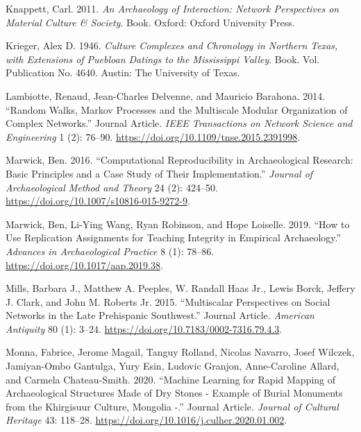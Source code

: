 \documentclass[smallextended]{svjour3}       %
\newlength{\cslhangindent}
\newlength{\cslentryspacingunit} %
\newenvironment{CSLReferences}[2] %
 {%
  \setlength{\parindent}{0pt}
  \ifodd #1
  \let\oldpar\par
  \def\par{\hangindent=\cslhangindent\oldpar}
  \fi
  \setlength{\parskip}{#2\cslentryspacingunit}
 }%
 {}
\begin{document}
\begin{CSLReferences}{1}{0}
\leavevmode{}%
Knappett, Carl. 2011. \emph{An Archaeology of Interaction: Network
Perspectives on Material Culture \& Society}. Book. Oxford: Oxford
University Press.

\leavevmode{}%
Krieger, Alex D. 1946. \emph{Culture Complexes and Chronology in
Northern Texas, with Extensions of Puebloan Datings to the Mississippi
Valley}. Book. Vol. Publication No. 4640. Austin: The University of
Texas.

\leavevmode{}%
Lambiotte, Renaud, Jean-Charles Delvenne, and Mauricio Barahona. 2014.
{``{Random Walks, Markov Processes and the Multiscale Modular
Organization of Complex Networks}.''} Journal Article. \emph{IEEE
Transactions on Network Science and Engineering} 1 (2): 76--90.
\url{https://doi.org/10.1109/tnse.2015.2391998}.

\leavevmode{}%
Marwick, Ben. 2016. {``Computational Reproducibility in Archaeological
Research: Basic Principles and a Case Study of Their Implementation.''}
\emph{Journal of Archaeological Method and Theory} 24 (2): 424--50.
\url{https://doi.org/10.1007/s10816-015-9272-9}.

\leavevmode{}%
Marwick, Ben, Li-Ying Wang, Ryan Robinson, and Hope Loiselle. 2019.
{``How to Use Replication Assignments for Teaching Integrity in
Empirical Archaeology.''} \emph{Advances in Archaeological Practice} 8
(1): 78--86. \url{https://doi.org/10.1017/aap.2019.38}.

\leavevmode{}%
Mills, Barbara J., Matthew A. Peeples, W. Randall Haas Jr., Lewis Borck,
Jeffery J. Clark, and John M. Roberts Jr. 2015. {``{Multiscalar
Perspectives on Social Networks in the Late Prehispanic Southwest}.''}
Journal Article. \emph{American Antiquity} 80 (1): 3--24.
\url{https://doi.org/10.7183/0002-7316.79.4.3}.

\leavevmode{}%
Monna, Fabrice, Jerome Magail, Tanguy Rolland, Nicolas Navarro, Josef
Wilczek, Jamiyan-Ombo Gantulga, Yury Esin, Ludovic Granjon,
Anne-Caroline Allard, and Carmela Chateau-Smith. 2020. {``Machine
Learning for Rapid Mapping of Archaeological Structures Made of Dry
Stones - Example of Burial Monuments from the Khirgisuur Culture,
Mongolia -.''} Journal Article. \emph{Journal of Cultural Heritage} 43:
118--28. \url{https://doi.org/10.1016/j.culher.2020.01.002}.


\end{CSLReferences}
\end{document}
